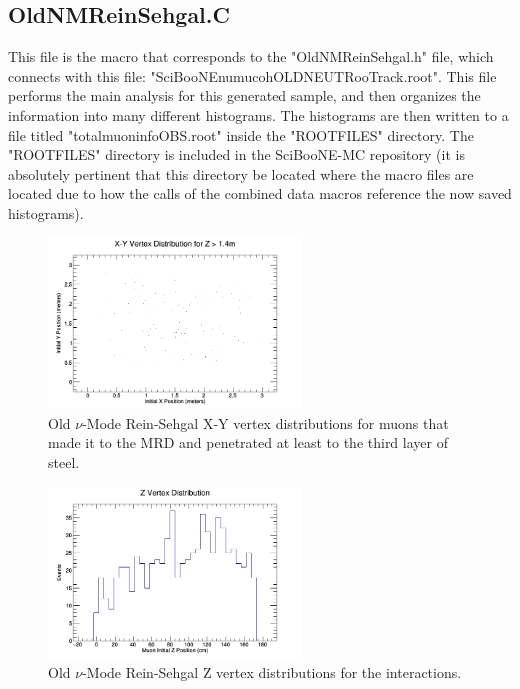 \documentclass[11pt]{article}
\begin{document}
\subsection{OldNMReinSehgal.C}
This file is the macro that corresponds to the "OldNMReinSehgal.h" file, which connects with this file: "SciBooNE\textunderscore numu\textunderscore coh\textunderscore OLDNEUT\textunderscore RooTrack.root". This file performs the main analysis for this generated sample, and then organizes the information into many different histograms. The histograms are then written to a file titled "totalmuoninfoOBS.root" inside the "ROOTFILES" directory. The "ROOTFILES" directory is included in the SciBooNE-MC repository (it is absolutely pertinent that this directory be located where the macro files are located due to how the calls of the combined data macros reference the now saved histograms).

\begin{figure}[H]
\centering
\includegraphics[width=0.6\textwidth]{OldNMReinSehgalImages/1-X-YVertexDistributionNMORS.png}
\caption{Old $\nu$-Mode Rein-Sehgal X-Y vertex distributions for muons that made it to the MRD and penetrated at least to the third layer of steel.}
\end{figure}

\begin{figure}[H]
\centering
\includegraphics[width=0.6\textwidth]{OldNMReinSehgalImages/2-ZVertexDistributionNMORS.png}
\caption{Old $\nu$-Mode Rein-Sehgal Z vertex distributions for the interactions.}
\end{figure}
\end{document}

